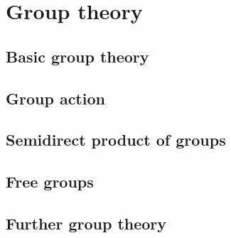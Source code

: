 \part{Group theory}

\chapter{Basic group theory}
    
    

\chapter{Group action}
    
    
    
    

\chapter{Semidirect product of groups}
    
    

\chapter{Free groups}
    

\chapter{Further group theory}
    
    
    
    
    
